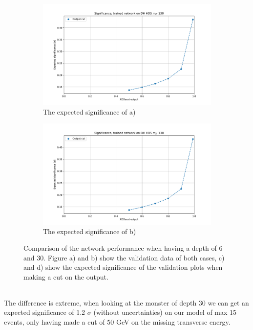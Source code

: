 \documentclass[12pt, a4paper]{book}
\begin{document}
\begin{figure}[!ht]
   \begin{subfigure}[b]{0.49\textwidth}
      \centering
      \includegraphics[width=1\textwidth]{EXP_SIG.pdf}
      \caption{The expected significance of a)}
   \end{subfigure}
   \hfill\graphicspath{{../../Plots/XGBoost/FULL/DH_HDS_mZp_130/}}
   \begin{subfigure}[b]{0.49\textwidth}
      \centering
      \includegraphics[width=1\textwidth]{EXP_SIG.pdf}
      \caption{The expected significance of b)}
   \end{subfigure}
   \caption{Comparison of the network performance when having a depth of 6 and 30. Figure a) and b) show the validation data of both cases, c) and d) show the expected significance of the validation plots when making a cut on the output. }
\end{figure}
\\The difference is extreme, when looking at the monster of depth 30 we can get an expected significance of 1.2 $\sigma$ (without uncertainties) on our model of max 15 events, only having made a cut of 50 GeV on the missing transverse energy.
\end{document}
